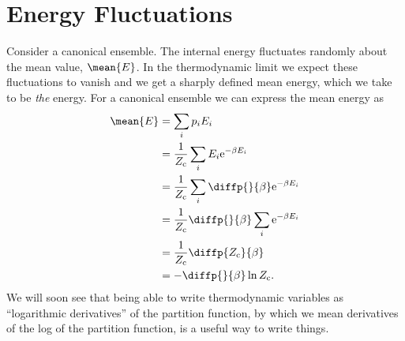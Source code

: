 \documentclass[fleqn]{NotesClass}
\newcommand*{\cpartition}{Z_{\mathrm{c}}}
\newcommand*{\e}{\mathrm{e}}
\begin{document}
    \section{Energy Fluctuations}
    Consider a canonical ensemble.
    The internal energy fluctuates randomly about the mean value, \(\mean{E}\).
    In the thermodynamic limit we expect these fluctuations to vanish and we get a sharply defined mean energy, which we take to be \emph{the} energy.
    For a canonical ensemble we can express the mean energy as
    \begin{align}
        \mean{E} &= \sum_i p_iE_i\\
        &= \frac{1}{\cpartition} \sum_i E_i\e^{-\beta E_i}\\
        &= \frac{1}{\cpartition} \sum_i \diffp{}{\beta} \e^{-\beta E_i}\\
        &= \frac{1}{\cpartition} \diffp{}{\beta} \sum_i \e^{-\beta E_i}\\
        &= \frac{1}{\cpartition} \diffp{\cpartition}{\beta}\\
        &= -\diffp{}{\beta} \ln \cpartition.
    \end{align}
    We will soon see that being able to write thermodynamic variables as \enquote{logarithmic derivatives} of the partition function, by which we mean derivatives of the log of the partition function, is a useful way to write things.
    
\end{document}
